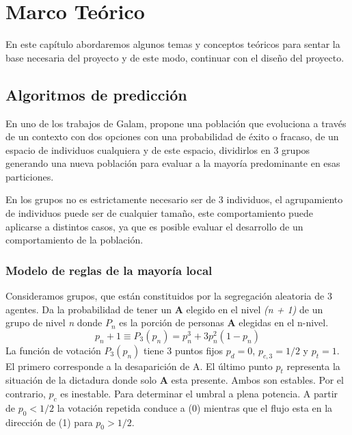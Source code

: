 \chapter{Marco Teórico}
\vspace*{2cm}
En este capítulo abordaremos algunos temas y conceptos teóricos para sentar la base necesaria del proyecto y de este modo, continuar con el diseño del proyecto.

\section{Algoritmos de predicción}
En uno de los trabajos de Galam, propone una población que evoluciona a través de un contexto con dos opciones con una probabilidad de éxito o fracaso, de un espacio de individuos cualquiera y de este espacio, dividirlos en 3 grupos generando una nueva población para evaluar a la mayoría predominante en esas particiones. \cite{Galam2008}

En los grupos no es estrictamente necesario ser de 3 individuos, el agrupamiento de individuos puede ser de cualquier tamaño, este comportamiento puede aplicarse a distintos casos, ya que es posible evaluar el desarrollo de un comportamiento de la población.

\subsection{Modelo de reglas de la mayoría local}
Consideramos grupos, que están constituidos por la segregación aleatoria de 3 agentes. Da la probabilidad de tener un \textbf{A} elegido en el nivel \textit{(n + 1)} de un grupo de nivel \textit{n} donde $P_{n}$ es la porción de personas \textbf{A} elegidas en el n-nivel.\cite{Galam2008}
\begin{equation}
    p_{n}+1 \equiv P_{3}(p_{n}) = p_{n}^3 + 3p_{n}^2(1-p_{n})
\end{equation}
La función de votación $P_{3}(p_{n})$ tiene 3 puntos fijos $p_{d} = 0$, $p_{c,3} = 1/2$ y $p_{t} = 1$. El primero corresponde a la desaparición de A. El último punto $p_{t}$ representa la situación de la dictadura donde solo \textbf{A} esta presente. Ambos son estables. Por el contrario, $p_{c}$ es inestable. Para determinar el umbral a plena potencia. A partir de $p_{0} < 1/2$ la votación repetida conduce a (0) mientras que el flujo esta en la dirección de (1) para $p_{0} > 1/2$.\cite{Galam2008}

